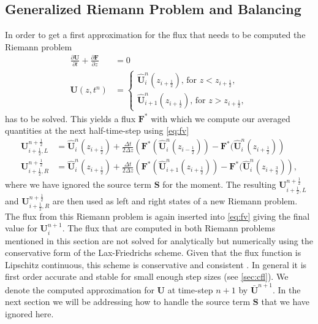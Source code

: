 \documentclass[a4paper, oneside]{discothesis}
\begin{document}
\subsection{Generalized Riemann Problem and Balancing} \label{ssec:grp}
In order to get a first approximation for the flux that needs to be computed the Riemann problem
\begin{align}
	\frac{\partial \mathbf{U}}{\partial t} + \frac{\partial \mathbf{F}}{\partial z} &= 0 \\
	\mathbf{U}(z,t^n) &= \left\{
		\begin{array}{c}
			\mathbf{\hat{U}}_i^n(z_{i+\frac{1}{2}}) \text{, for } z < z_{i+\frac{1}{2}}, \\
			\mathbf{\hat{U}}_{i+1}^n(z_{i+\frac{1}{2}}) \text{, for } z > z_{i+\frac{1}{2}},
	\end{array} \right.  
	\end{align}
	has to be solved.
	This yields a flux $\mathbf{F^*}$ with which we compute our averaged quantities at the next half-time-step using \autoref{eq:fv}
	\begin{align}
		\mathbf{U}_{i+\frac{1}{2},L}^{n+\frac{1}{2}} &= \mathbf{\hat{U}}_i^n(z_{i+\frac{1}{2}}) + \frac{\Delta t}{2 \Delta z} \left( \mathbf{F^*}(\mathbf{\hat{U}}_i^n( z_{i-\frac{1}{2}})) - \mathbf{F^*}(\mathbf{\hat{U}}_i^n(z_{i+\frac{1}{2}}) \right)\\
		\mathbf{U}_{i+\frac{1}{2},R}^{n+\frac{1}{2}} &= \mathbf{\hat{U}}_i^n(z_{i+\frac{1}{2}}) + \frac{\Delta t}{2 \Delta z} \left( \mathbf{F^*}(\mathbf{\hat{U}}_{i+1}^n( z_{i+\frac{1}{2}})) - \mathbf{F^*}(\mathbf{\hat{U}}_i^n(z_{i+\frac{3}{2}}) \right),
	\end{align}
	where we have ignored the source term $\mathbf{S}$ for the moment.
	The resulting $\mathbf{U}_{i+\frac{1}{2},L}^{n+\frac{1}{2}}$ and $\mathbf{U}_{i+\frac{1}{2},R}^{n+\frac{1}{2}}$ are then used as left and right states of a new Riemann problem.
	The flux from this Riemann problem is again inserted into \autoref{eq:fv} giving the final value for $\mathbf{U}_i^{n+1}$.
	The flux that are computed in both Riemann problems mentioned in this section are not solved for analytically but numerically using the conservative form of the Lax-Friedrichs scheme.
	Given that the flux function is Lipschitz continuous, this scheme is conservative and consistent \cite{köppl2023dimension}.
	In general it is first order accurate and stable for small enough step sizes (see \autoref{sec:cfl}). \cite{leveque1992numerical}
	We denote the computed approximation for $\mathbf{U}$ at time-step $n+1$ by $\bar{\mathbf{U}}^{n+1}$.
	In the next section we will be addressing how to handle the source term $\mathbf{S}$ that we have ignored here.
\end{document}
